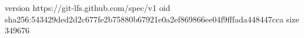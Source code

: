 version https://git-lfs.github.com/spec/v1
oid sha256:543429ded2d2c677fe2b75880b67921e0a2ef869866ee04f9fffada448447cca
size 349676
